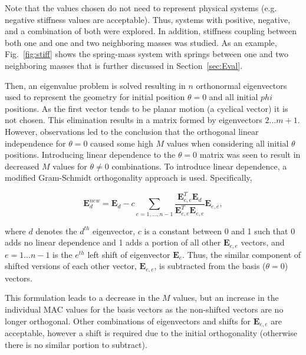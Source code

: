 \documentclass[3p,times]{elsarticle}
\begin{document}
Note that the values chosen do not need to represent physical systems (e.g. negative stiffness values are acceptable).  Thus, systems with positive, negative, and a combination of both were explored.  In addition, stiffness coupling between both one and one and two neighboring masses was studied.  
As an example, Fig.~\ref{fig:stiff} shows the spring-mass system with springs between one and two neighboring masses 
that is further discussed in Section~\ref{sec:Eval}.

Then, an eigenvalue problem is solved resulting in $n$ orthonormal eigenvectors used to represent the geometry for initial position $\theta=0$ and all initial $phi$ positions.  
As the first vector tends to be planar motion (a cyclical vector) it is not chosen.  
This elimination results in a matrix formed by eigenvectors $2...m+1$.  
However, observations led to the conclusion that the orthogonal linear independence for $\theta=0$ caused some high $M$ values when considering all initial $\theta$ positions.  
Introducing linear dependence to the $\theta=0$ matrix was seen to result in decreased $M$ values for $\theta\neq 0$ combinations.  
To introduce linear dependence, a modified Gram-Schmidt orthogonality approach is used.  Specifically, 

\begin{equation}
\mathbf{E}^{new}_{d}=\mathbf{E}_{d}- c \sum_{e=1,...,n-1} \frac{\mathbf{E}_{e,e}^T \mathbf{E}_{d}}{\mathbf{E}_{e,e}^T \mathbf{E}_{e,e}}\mathbf{E}_{e,e},
\label{eq:GS}
\end{equation}

\noindent where $d$ denotes the $d^{th}$ eigenvector, $c$ is a constant between 0 and 1 such that 0 adds no linear dependence and 1 adds a portion of all other $\mathbf{E}_{e,e}$ vectors, and $e=1...n-1$ is the $e^{th}$ left shift of eigenvector $\mathbf{E}_e$. 
Thus, the similar component of shifted versions of each other vector, $\mathbf{E}_{e,e}$, is subtracted from the basis ($\theta=0$) vectors. 

This formulation leads to a decrease in the $M$ values, but an increase in the individual MAC values for the basis vectors as the non-shifted vectors are no longer orthogonal.
Other combinations of eigenvectors and shifts for $\mathbf{E}_{e,e}$ are acceptable, however a shift is required due to the initial orthogonality (otherwise there is no similar portion to subtract).
\end{document}
